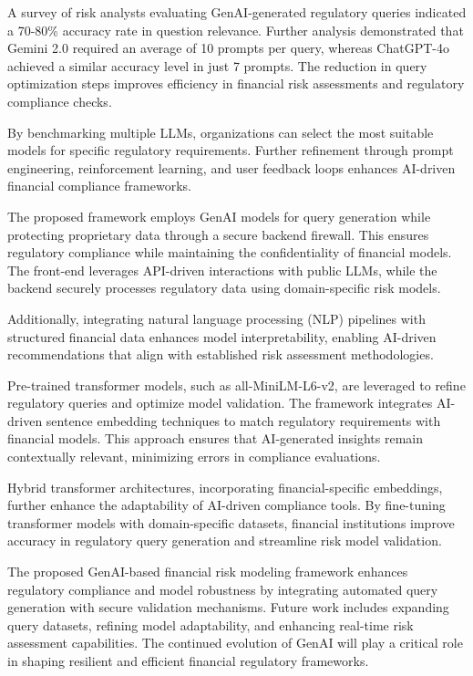 \documentclass[a4paper,12pt]{scrbook}
\begin{document}
	A survey of risk analysts evaluating GenAI-generated regulatory queries indicated a 70-80\% accuracy rate in question relevance. Further analysis demonstrated that Gemini 2.0 required an average of 10 prompts per query, whereas ChatGPT-4o achieved a similar accuracy level in just 7 prompts. The reduction in query optimization steps improves efficiency in financial risk assessments and regulatory compliance checks.
	
	By benchmarking multiple LLMs, organizations can select the most suitable models for specific regulatory requirements. Further refinement through prompt engineering, reinforcement learning, and user feedback loops enhances AI-driven financial compliance frameworks.
	
	
	The proposed framework employs GenAI models for query generation while protecting proprietary data through a secure backend firewall. This ensures regulatory compliance while maintaining the confidentiality of financial models. The front-end leverages API-driven interactions with public LLMs, while the backend securely processes regulatory data using domain-specific risk models.
	
	Additionally, integrating natural language processing (NLP) pipelines with structured financial data enhances model interpretability, enabling AI-driven recommendations that align with established risk assessment methodologies.
	
	Pre-trained transformer models, such as all-MiniLM-L6-v2, are leveraged to refine regulatory queries and optimize model validation. The framework integrates AI-driven sentence embedding techniques to match regulatory requirements with financial models. This approach ensures that AI-generated insights remain contextually relevant, minimizing errors in compliance evaluations.
	
	Hybrid transformer architectures, incorporating financial-specific embeddings, further enhance the adaptability of AI-driven compliance tools. By fine-tuning transformer models with domain-specific datasets, financial institutions improve accuracy in regulatory query generation and streamline risk model validation.
	
	The proposed GenAI-based financial risk modeling framework enhances regulatory compliance and model robustness by integrating automated query generation with secure validation mechanisms. Future work includes expanding query datasets, refining model adaptability, and enhancing real-time risk assessment capabilities. The continued evolution of GenAI will play a critical role in shaping resilient and efficient financial regulatory frameworks.
	
\end{document}
